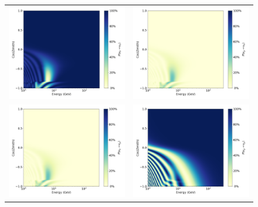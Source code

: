 \begin{figure}
\centering
\begin{tabular}{cc}
    \includegraphics[width=0.48\linewidth]{prob3_nue_nue.png} &  
    \includegraphics[width=0.48\linewidth]{prob3_numu_nue.png} \\  

    \includegraphics[width=0.48\linewidth]{prob3_nue_numu.png} &  
    \includegraphics[width=0.48\linewidth]{prob3_numu_numu.png} \\  


\end{tabular}
\end{figure}
